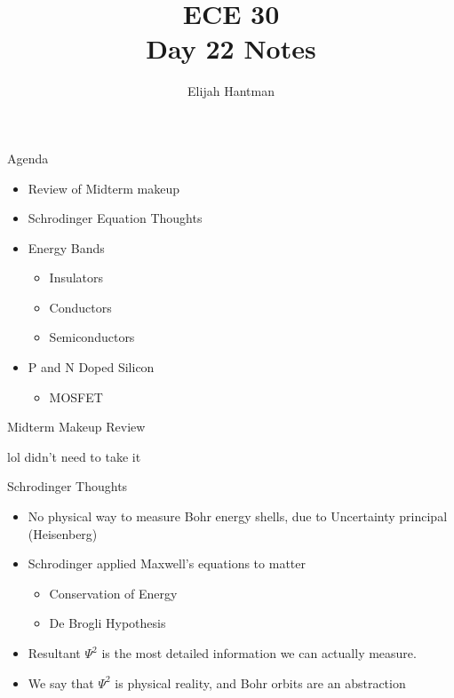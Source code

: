\documentclass{report}
\title{\Huge{ECE 30}\\Day 22 Notes}
\author{\huge{Elijah Hantman}}
\date{}
\begin{document}
\maketitle
\newpage

\begin{description}
    \item {\large Agenda} 
        \begin{mdframed}
            \begin{itemize}
                \item Review of Midterm makeup
                \item Schrodinger Equation Thoughts
                \item Energy Bands
                    \begin{itemize}
                        \item Insulators
                        \item Conductors
                        \item Semiconductors
                    \end{itemize}
                \item P and N Doped Silicon
                    \begin{itemize}
                        \item MOSFET
                    \end{itemize}
            \end{itemize}
        \end{mdframed}
    \item {\large Midterm Makeup Review}
        \begin{mdframed}
           lol didn't need to take it 
        \end{mdframed}
    \item {\large Schrodinger Thoughts}
        \begin{mdframed}
            \begin{itemize}
                \item No physical way to measure Bohr energy
                    shells, due to Uncertainty principal (Heisenberg)
                \item Schrodinger applied Maxwell's equations to matter
                    \begin{itemize}
                        \item Conservation of Energy
                        \item De Brogli Hypothesis
                    \end{itemize}
                \item Resultant $\Psi^2$ is the most detailed
                    information we can actually measure.
                \item We say that $\Psi^2$ is physical reality,
                    and Bohr orbits are an abstraction
            \end{itemize}


\end{mdframed}
\end{description}
\end{document}
